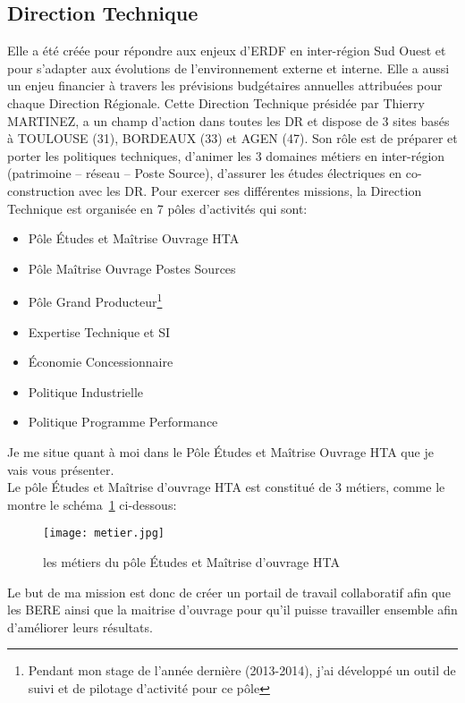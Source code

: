 \subsection*{Direction Technique}
 Elle a été créée pour répondre aux enjeux d'ERDF en inter-région Sud Ouest et pour s'adapter aux évolutions de l'environnement externe et interne.
Elle a aussi un enjeu financier à travers les prévisions budgétaires annuelles attribuées pour chaque Direction Régionale.
Cette Direction Technique présidée par Thierry MARTINEZ, a un champ d'action dans toutes les DR et
dispose de 3 sites basés à TOULOUSE (31), BORDEAUX (33) et AGEN (47).
Son rôle est de préparer et porter les politiques techniques, d'animer les 3 domaines métiers en inter-région (patrimoine – réseau – Poste Source), d'assurer les études électriques en co-construction avec les DR.
Pour exercer ses différentes missions, la Direction Technique est organisée en 7 pôles d'activités
qui sont:
\begin{itemize}
\item Pôle Études et Maîtrise Ouvrage HTA
\item Pôle Maîtrise Ouvrage Postes Sources
\item Pôle Grand Producteur\footnote{Pendant mon stage de l'année dernière (2013-2014), j'ai développé un outil de suivi et de pilotage d'activité pour ce pôle}
\item Expertise Technique et SI
\item Économie Concessionnaire
\item Politique Industrielle
\item Politique Programme Performance
\end{itemize}
Je me situe quant à moi dans le \og Pôle Études et Maîtrise Ouvrage HTA\fg{} que je vais vous présenter.\\ Le pôle \og Études et Maîtrise d'ouvrage HTA\fg{} est constitué de 3 métiers, comme le montre le schéma~\ref{metier} ci-dessous:
\begin{figure}[h]
\centering
\texttt{[image: metier.jpg]}
\caption{\label{metier}les métiers du pôle \og Études et Maîtrise d’ouvrage HTA\fg{}}
\end{figure}
Le but de ma mission est donc de créer un portail de travail collaboratif afin que les BERE ainsi que la maitrise d'ouvrage pour qu'il puisse travailler ensemble afin d'améliorer leurs résultats. 
